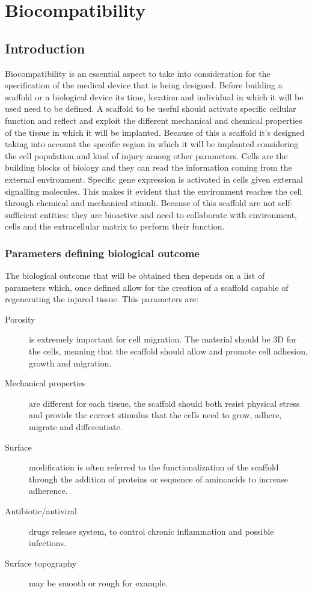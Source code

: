 \graphicspath{{chapters/06_images/}}
\chapter{Biocompatibility}

\section{Introduction}
Biocompatibility is an essential aspect to take into consideration for the specification of the medical device that is being designed.
Before building a scaffold or a biological device its time, location and individual in which it will be used need to be defined.
A scaffold to be useful should activate specific cellular function and reflect and exploit the different mechanical and chemical properties of the tissue in which it will be implanted.
Because of this a scaffold it's designed taking into account the specific region in which it will be implanted considering the cell population and kind of injury among other parameters.
Cells are the building blocks of biology and they can read the information coming from the external environment.
Specific gene expression is activated in cells given external signalling molecules.
This makes it evident that the environment reaches the cell through chemical and mechanical stimuli.
Because of this scaffold are not self-sufficient entities: they are bioactive and need to collaborate with environment, cells and the extracellular matrix to perform their function.

	\subsection{Parameters defining biological outcome}
	The biological outcome that will be obtained then depends on a list of parameters which, once defined allow for the creation of a scaffold capable of regenerating the injured tissue.
	This parameters are:

	\begin{multicols}{2}
		\begin{description}
		\item[Porosity] is extremely important for cell migration.
			The material should be 3D for the cells, meaning that the scaffold should allow and promote cell adhesion, growth and migration.
		\item[Mechanical properties] are different for each tissue, the scaffold should both resist physical stress and provide the correct stimulus that the cells need to grow, adhere, migrate and differentiate.
		\item[Surface] modification is often referred to the functionalization of the scaffold through the addition of proteins or sequence of aminoacids to increase adherence.
		\item[Antibiotic/antiviral] drugs release system, to control chronic inflammation and possible infections.
		\item[Surface topography] may be smooth or rough for example.
		\end{description}
	\end{multicols}

